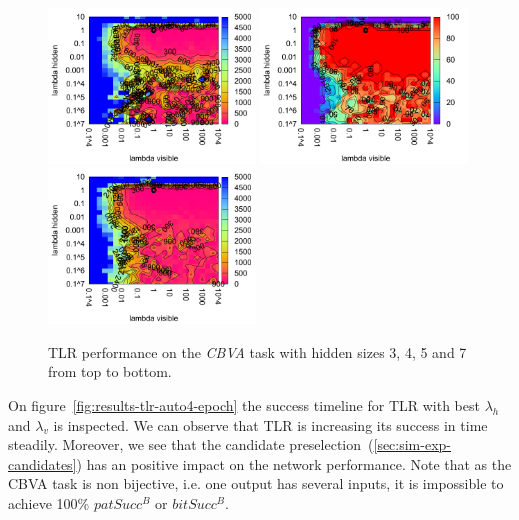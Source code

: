 \begin{figure}[H]
  \includegraphics[width=0.49\textwidth]{img/k3/tlr-5-epoch.pdf}  
  \includegraphics[width=0.49\textwidth]{img/k3/tlr-7-success.pdf} 
  \includegraphics[width=0.49\textwidth]{img/k3/tlr-7-epoch.pdf}    
  \caption{TLR performance on the \emph{CBVA} task with hidden sizes 3, 4, 5 and 7 from top to bottom.}
  \label{fig:results-tlr-k3-performance}
\end{figure}

On figure~\ref{fig:results-tlr-auto4-epoch} the success timeline for TLR with best $\lambda_h$ and $\lambda_v$ is inspected. We can observe that TLR is increasing its success in time steadily. Moreover, we see that the candidate preselection~(\ref{sec:sim-exp-candidates}) has an positive impact on the network performance.
Note that as the CBVA task is non bijective, i.e. one output has several inputs, it is impossible to achieve 100\% $patSucc^B$ or $bitSucc^B$. 

